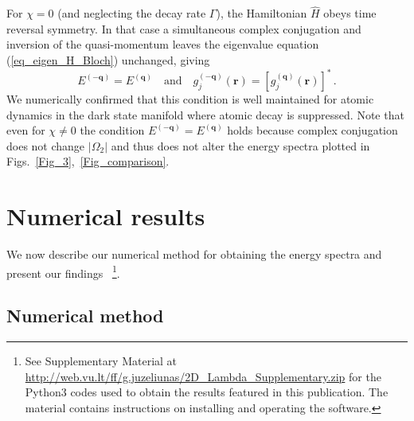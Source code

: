 \documentclass[aps,pra,twocolumn,showpacs,superscriptaddress,floatfix,longbibliography]{revtex4-1}
\begin{document}
For $\chi=0$ (and neglecting the decay rate $\Gamma$), the Hamiltonian $\hat{H}$ obeys time reversal symmetry.
In that case a simultaneous complex
conjugation and inversion of the quasi-momentum leaves the eigenvalue equation (\ref{eq_eigen_H_Bloch}) unchanged, giving 
\begin{equation}
E^{(-\boldsymbol{q})}=E^{(\boldsymbol{q})}\quad\mathrm{and}\quad g_{j}^{(-\boldsymbol{q})}(\boldsymbol{r})=\left[g_{j}^{(\boldsymbol{q})}(\boldsymbol{r})\right]^{*}\,.\label{eq:Time-reversal}
\end{equation}
We numerically confirmed that this condition is well maintained for atomic dynamics in the dark state manifold where atomic decay is suppressed.
Note that even for $\chi\ne0$ the condition $E^{(-\boldsymbol{q})}=E^{(\boldsymbol{q})}$ holds because complex conjugation does not change $|\Omega_{2}|$ and thus does not alter the energy spectra plotted in Figs.~\ref{Fig_3},~\ref{Fig_comparison}.

\section{Numerical results}\label{sec:results}

We now describe our numerical method for obtaining the energy spectra and present our findings~
\footnote{See Supplementary Material at \url{http://web.vu.lt/ff/g.juzeliunas/2D_Lambda_Supplementary.zip} for the Python3 codes used to obtain the results featured in this publication. The material contains instructions on installing and operating the software.}.


\subsection{Numerical method}
\label{Sec_numerical_method}
\end{document}
